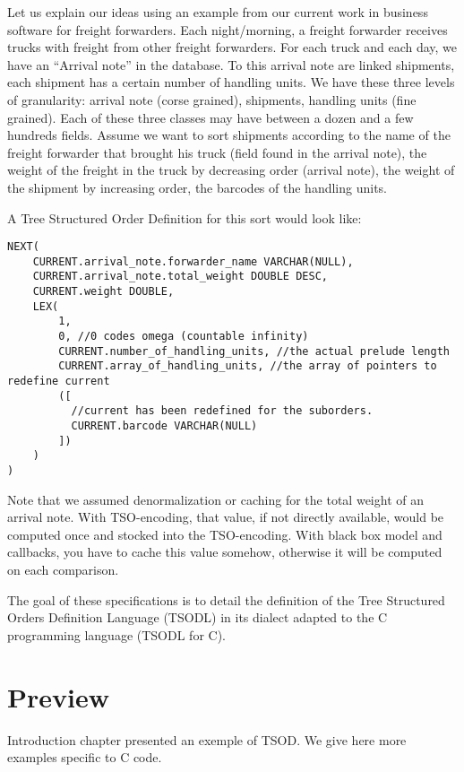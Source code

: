 \documentclass[a4paper,11pt]{report}
\begin{document}
Let us explain our ideas using an example from our current work in business software for freight forwarders.
Each night/morning, a freight forwarder receives trucks with freight from other freight forwarders.
For each truck and each day, we have an ``Arrival note'' in the database.
To this arrival note are linked shipments, each shipment has a certain number of handling units.
We have these three levels of granularity: arrival note (corse grained), shipments, handling units (fine grained).
Each of these three classes may have between a dozen and a few hundreds fields.
Assume we want to sort shipments according to the name of the freight forwarder that brought his truck (field found in the arrival note),
the weight of the freight in the truck by decreasing order (arrival note), the weight of the shipment by increasing order,
 the barcodes of the handling units.

A Tree Structured Order Definition for this sort would look like:
\begin{verbatim}
NEXT(
    CURRENT.arrival_note.forwarder_name VARCHAR(NULL),
    CURRENT.arrival_note.total_weight DOUBLE DESC,
    CURRENT.weight DOUBLE,
    LEX(
        1,
        0, //0 codes omega (countable infinity)
        CURRENT.number_of_handling_units, //the actual prelude length
        CURRENT.array_of_handling_units, //the array of pointers to redefine current
        ([
          //current has been redefined for the suborders.
          CURRENT.barcode VARCHAR(NULL)
        ])
    )
)
\end{verbatim}

Note that we assumed denormalization or caching for the total weight of an arrival note.
With TSO-encoding, that value, if not directly available, would be computed once and stocked into the TSO-encoding.
With black box model and callbacks, you have to cache this value somehow, otherwise it will be computed on each comparison.

The goal of these specifications is to detail the definition
of the Tree Structured Orders Definition Language (TSODL)
in its dialect adapted to the C programming language (TSODL for C).

\chapter{Preview}
\label{chapter:preview}

Introduction chapter presented an exemple of TSOD.
We give here more examples specific to C code.
\end{document}
